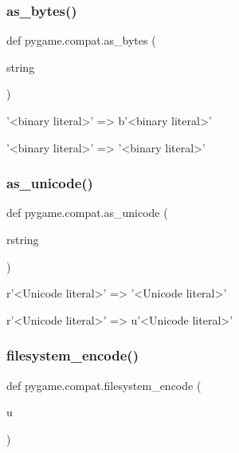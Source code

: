 \subsubsection{\texorpdfstring{as\+\_\+bytes()}{as\_bytes()}}
{\footnotesize\ttfamily def pygame.\+compat.\+as\+\_\+bytes (\begin{DoxyParamCaption}\item[{}]{string }\end{DoxyParamCaption})}

\begin{DoxyVerb}'<binary literal>' => b'<binary literal>' \end{DoxyVerb}


\begin{DoxyVerb}'<binary literal>' => '<binary literal>' \end{DoxyVerb}
 \mbox{\label{namespacepygame_1_1compat_a967d563eb32bd2ba1c5d93031f099862}} 
\subsubsection{\texorpdfstring{as\+\_\+unicode()}{as\_unicode()}}
{\footnotesize\ttfamily def pygame.\+compat.\+as\+\_\+unicode (\begin{DoxyParamCaption}\item[{}]{rstring }\end{DoxyParamCaption})}

\begin{DoxyVerb}r'<Unicode literal>' => '<Unicode literal>' \end{DoxyVerb}


\begin{DoxyVerb}r'<Unicode literal>' => u'<Unicode literal>' \end{DoxyVerb}
 \mbox{\label{namespacepygame_1_1compat_ae5e79f8485dad05b06633d04dee8f94e}} 
\subsubsection{\texorpdfstring{filesystem\+\_\+encode()}{filesystem\_encode()}}
{\footnotesize\ttfamily def pygame.\+compat.\+filesystem\+\_\+encode (\begin{DoxyParamCaption}\item[{}]{u }\end{DoxyParamCaption})}

